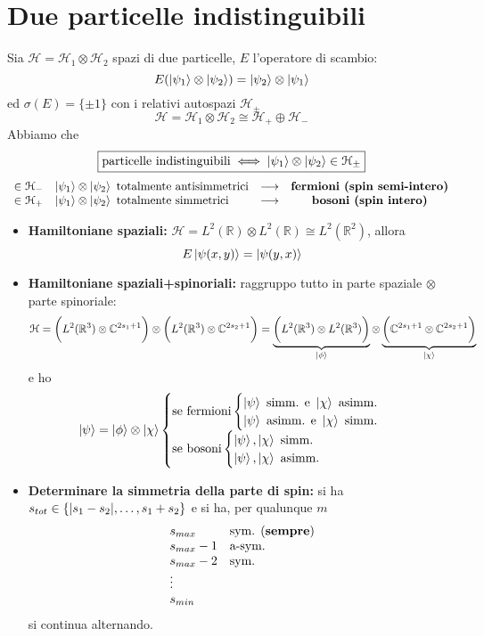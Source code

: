 \documentclass[a4paper,10pt]{article}
\theoremstyle{definition}
\newcommand{\re}{\mathbb{R}} %
\newcommand{\im}{\mathbb{C}} %
\newcommand{\hil}{\mathcal{H}} %
\theoremstyle{indentdefinition}
\theoremstyle{indenttheorem}
\theoremstyle{myremark}
\theoremstyle{indentgeneral}
\begin{document}
\section{Due particelle indistinguibili}
Sia $\hil=\hil_1\otimes\hil_2$ spazi di due particelle, $E$ l'operatore di scambio: 
$$E(\ket{\psi_1}\otimes\ket{\psi_2})=\ket{\psi_2}\otimes\ket{\psi_1}$$
ed $\sigma(E)=\{\pm 1\}$ con i relativi autospazi $\hil_\pm$ 
$$\hil=\hil_1\otimes\hil_2\cong \boxed{\hil_+\oplus\hil_-}$$ 
Abbiamo che 
$$\boxed{\text{particelle indistinguibili}\iff  \ket{\psi_1}\otimes\ket{\psi_2}\in\hil_\pm}$$
\begin{align*}
    \begin{array}{llcc}
         \in\hil_- &  \ket{\psi_1}\otimes\ket{\psi_2}  \text{ totalmente antisimmetrici} & \longrightarrow & \text{\textbf{fermioni (spin semi-intero)}}  \\
         \in\hil_+ & \ket{\psi_1}\otimes\ket{\psi_2}  \text{ totalmente simmetrici} & \longrightarrow & \text{\textbf{bosoni (spin intero)}}  
    \end{array}
\end{align*}

\begin{itemize}
    \item \textbf{Hamiltoniane spaziali:} $\hil=L^2(\re)\otimes L^2(\re)\cong L^2(\re^2)$, allora
    $$E\ket{\psi(x,y)}=\ket{\psi(y,x)}$$
    \item \textbf{Hamiltoniane spaziali+spinoriali:} raggruppo tutto in parte spaziale $  \otimes$ parte spinoriale: $$\hil=\bigg(L^2(\re^3)\otimes\im^{2s_1+1}\bigg)\otimes\bigg(L^2(\re^3)\otimes\im^{2s_2+1}\bigg)=\underbrace{\bigg(L^2(\re^3)\otimes L^2(\re^3)\bigg)}_{\ket{\phi}}\otimes \underbrace{\bigg(\im^{2s_1+1}\otimes \im^{2s_2+1}\bigg)}_{\ket{\chi}} $$
    e ho
    $$\ket{\psi}=\ket{\phi}\otimes\ket{\chi}\begin{cases}
        \text{se fermioni} \begin{cases}
            \ket{\psi} \text{ simm. e }\ket{\chi} \text{ asimm.}\\
            \ket{\psi} \text{ asimm. e }\ket{\chi} \text{ simm.}
        \end{cases} \\
        \text{se bosoni}\begin{cases}
            \ket{\psi},\ket{\chi} \text{ simm.}\\
            \ket{\psi},\ket{\chi} \text{ asimm.}
        \end{cases}
    \end{cases}$$
    \item \textbf{Determinare la simmetria della parte di spin:} si ha $s_{tot}\in\{\abs{s_1-s_2},\dots,s_1+s_2\}$ e si ha, per qualunque $m$
    $$\begin{array}{ll}
        s_{max} & \text{sym. (\textbf{sempre})}  \\
        s_{max}-1 & \text{a-sym.} \\
        s_{max}-2 & \text{sym.} \\
        \vdots\\
        s_{min}
    \end{array}$$
    si continua alternando.
\end{itemize}
\end{document}
